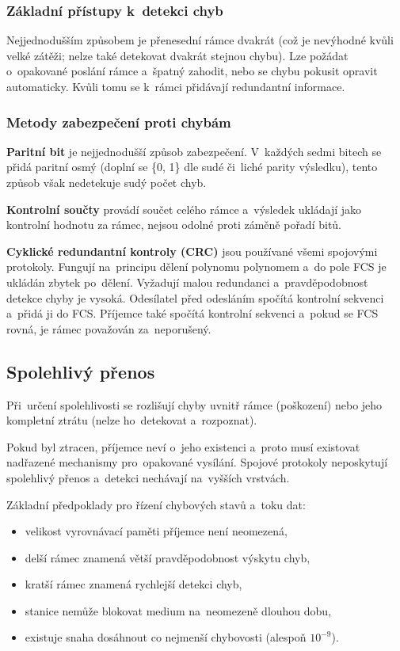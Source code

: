 \subsubsection{Základní přístupy k~detekci chyb}

Nejjednodušším způsobem je přenesední rámce dvakrát (což je nevýhodné kvůli velké zátěži; nelze také detekovat dvakrát stejnou chybu). Lze požádat o~opakované poslání rámce a~špatný zahodit, nebo se chybu pokusit opravit automaticky. Kvůli tomu se k~rámci přidávají redundantní informace.

\subsubsection{Metody zabezpečení proti chybám}

\textbf{Paritní bit} je nejjednodušší způsob zabezpečení. V~každých sedmi bitech se přidá paritní osmý (doplní se \{0, 1\} dle sudé či~liché parity výsledku), tento způsob však nedetekuje sudý počet chyb.

\textbf{Kontrolní součty} provádí součet celého rámce a~výsledek ukládají jako kontrolní hodnotu za rámec, nejsou odolné proti záměně pořadí bitů.

\textbf{Cyklické redundantní kontroly (CRC)} jsou používané všemi spojovými protokoly. Fungují na~principu dělení polynomu polynomem a~do pole FCS je ukládán zbytek po~dělení. Vyžadují malou redundanci a~pravděpodobnost detekce chyby je vysoká. Odesílatel před odesláním spočítá kontrolní sekvenci a~přidá ji do FCS. Příjemce také spočítá kontrolní sekvenci a~pokud se FCS rovná, je rámec považován za~neporušený.

\subsection{Spolehlivý přenos}

Při~určení spolehlivosti se rozlišují chyby uvnitř rámce (poškození) nebo jeho kompletní ztrátu (nelze ho~detekovat a~rozpoznat).

Pokud byl ztracen, příjemce neví o~jeho existenci a~proto musí existovat nadřazené mechanismy pro~opakované vysílání. Spojové protokoly neposkytují spolehlivý přenos a~detekci nechávají na~vyšších vrstvách.

Základní předpoklady pro řízení chybových stavů a~toku dat:

\begin{itemize}[noitemsep]
    \item velikost vyrovnávací paměti příjemce není neomezená,
    \item delší rámec znamená větší pravděpodobnost výskytu chyb,
    \item kratší rámec znamená rychlejší detekci chyb,
    \item stanice nemůže blokovat medium na~neomezeně dlouhou dobu,
    \item existuje snaha dosáhnout co nejmenší chybovosti (alespoň $10^{-9}$).
\end{itemize}

